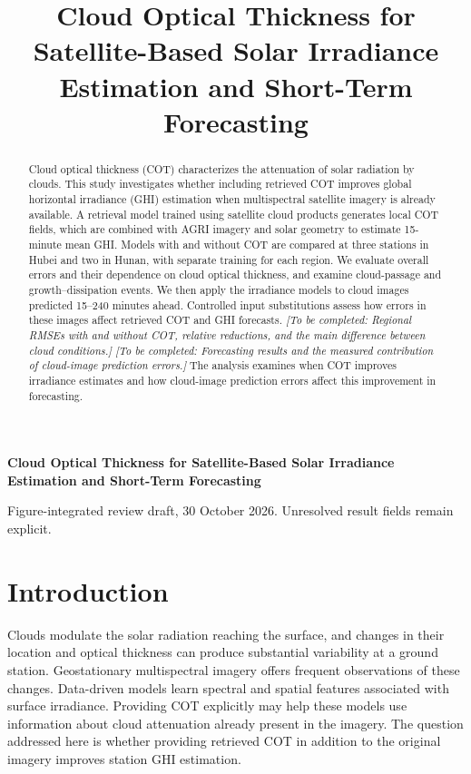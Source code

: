 \documentclass[11pt]{article}
\title{Cloud Optical Thickness for Satellite-Based Solar Irradiance Estimation and Short-Term Forecasting}
\author{}\date{}
\newcommand{\pending}[1]{\textit{[To be completed: #1]}}
\begin{document}
\begin{center}\LARGE\bfseries
Cloud Optical Thickness for Satellite-Based Solar Irradiance Estimation and Short-Term Forecasting
\end{center}
\begin{center}\small Figure-integrated review draft, 30 October 2026. Unresolved result fields remain explicit.\end{center}
\begin{abstract}
Cloud optical thickness (COT) characterizes the attenuation of solar radiation by clouds. This study investigates whether including retrieved COT improves global horizontal irradiance (GHI) estimation when multispectral satellite imagery is already available. A retrieval model trained using satellite cloud products generates local COT fields, which are combined with AGRI imagery and solar geometry to estimate 15-minute mean GHI. Models with and without COT are compared at three stations in Hubei and two in Hunan, with separate training for each region. We evaluate overall errors and their dependence on cloud optical thickness, and examine cloud-passage and growth--dissipation events. We then apply the irradiance models to cloud images predicted 15--240 minutes ahead. Controlled input substitutions assess how errors in these images affect retrieved COT and GHI forecasts. \pending{Regional RMSEs with and without COT, relative reductions, and the main difference between cloud conditions.} \pending{Forecasting results and the measured contribution of cloud-image prediction errors.} The analysis examines when COT improves irradiance estimates and how cloud-image prediction errors affect this improvement in forecasting.
\end{abstract}

\section{Introduction}
Clouds modulate the solar radiation reaching the surface, and changes in their location and optical thickness can produce substantial variability at a ground station. Geostationary multispectral imagery offers frequent observations of these changes. Data-driven models learn spectral and spatial features associated with surface irradiance. Providing COT explicitly may help these models use information about cloud attenuation already present in the imagery. The question addressed here is whether providing retrieved COT in addition to the original imagery improves station GHI estimation.
\end{document}
